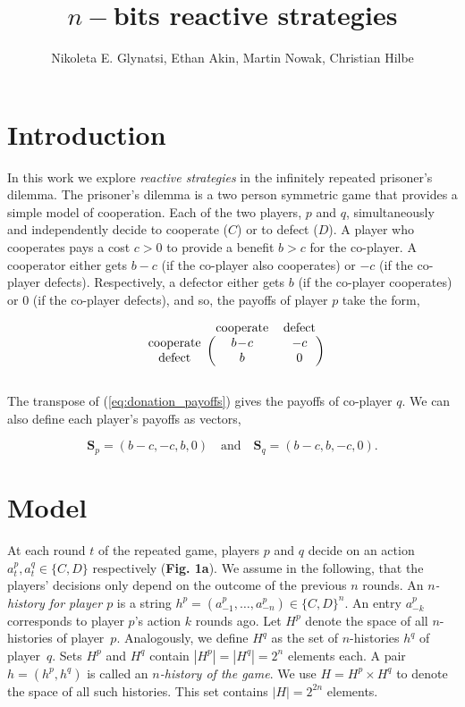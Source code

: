 \documentclass{article}
\title{$n-$bits reactive strategies}
\author{Nikoleta E. Glynatsi, Ethan Akin, Martin Nowak, Christian Hilbe}
\date{}
\theoremstyle{definition}
\begin{document}
\maketitle


\section{Introduction}

In this work we explore \textit{reactive strategies} in the infinitely repeated
prisoner's dilemma. The prisoner's dilemma is a two person symmetric game that
provides a simple model of cooperation. Each of the two players, \(p\) and
\(q\), simultaneously and independently decide to cooperate (\(C\)) or to defect
(\(D\)). A player who cooperates pays a cost \(c > 0\) to provide a benefit \(b
> c\) for the co-player. A cooperator either gets \(b\!-\!c\) (if the co-player
also cooperates) or \(-c\) (if the co-player defects). Respectively, a defector
either gets \(b\) (if the co-player cooperates) or 0 (if the co-player defects),
and so, the payoffs of player \(p\) take the form,

\begin{equation}\label{eq:donation_payoffs}
  \begin{blockarray}{ccc}
      & \text{cooperate} & \text{defect} \\
      \begin{block}{c(cc)}
          \text{cooperate} & b\!-\!c & -c \\
          \text{defect} & b & 0 \\
      \end{block}
  \end{blockarray}
\end{equation}

The transpose of (\ref{eq:donation_payoffs}) gives the payoffs of co-player
\(q\). We can also define each player's payoffs as vectors,

\begin{equation}\label{eq:vector_payoffs}
  \mathbf{S}_{p} = (b\!-\!c, -c, b, 0) \quad \textrm{and} \quad  \mathbf{S}_{q} = (b\!-\!c, b, -c, 0).
\end{equation}

\section{Model}

At each round $t$ of the repeated game, players \(p\) and \(q\) decide on an
action \(a^{p}_{t}, a^{q}_{t} \in \{C, D\}\) respectively (\textbf{Fig. 1a}). We
assume in the following, that the players' decisions only depend on the outcome
of the previous $n$ rounds. An {\it $n$-history for player $p$} is a string
$h^p=(a^p_{-1},\ldots,a^p_{-n})\!\in\!\{C,D\}^n$. An entry $a^p_{-k}$
corresponds to player $p$'s action $k$ rounds ago. Let $H^p$ denote the space of
all $n$-histories of player~$p$. Analogously, we define $H^q$ as the set of
$n$-histories $h^q$ of player~$q$. Sets $H^p$ and $H^q$ contain
$|H^p|=|H^q|=2^{n}$ elements each. A pair $h\!=\!(h^p,h^q)$ is called an {\it
$n$-history of the game}. We use $H=H^p\times H^q$ to denote the space of all
such histories. This set contains $|H|=2^{2n}$ elements. 
\end{document}
